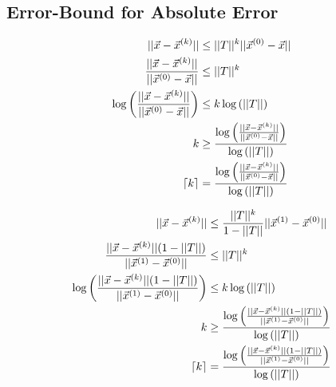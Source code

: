 	\subsection{Error-Bound for Absolute Error}
		\begin{align}
			||\vec{x}-\vec{x}^{(k)}|| &\leq ||T||^{k}||\vec{x}^{(0)}-\vec{x}||& \\
			\frac{||\vec{x}-\vec{x}^{(k)}||}{||\vec{x}^{(0)}-\vec{x}||} &\leq ||T||^{k}& \notag \\
			\log{\left(\frac{||\vec{x}-\vec{x}^{(k)}||}{||\vec{x}^{(0)}-\vec{x}||}\right)} &\leq k \log{(||T||)}& \notag \\
			k &\geq \frac{\log{\left(\frac{||\vec{x}-\vec{x}^{(k)}||}{||\vec{x}^{(0)}-\vec{x}||}\right)}}{\log{(||T||)}}& \notag \\
			\lceil k \rceil &= \frac{\log{\left(\frac{||\vec{x}-\vec{x}^{(k)}||}{||\vec{x}^{(0)}-\vec{x}||}\right)}}{\log{\left(||T||\right)}}&
		\end{align}

		\begin{align}
			||\vec{x}-\vec{x}^{(k)}|| &\leq \frac{||T||^{k}}{1-||T||}||\vec{x}^{(1)}-\vec{x}^{(0)}||& \\
			\frac{||\vec{x}-\vec{x}^{(k)}||(1-||T||)}{||\vec{x}^{(1)}-\vec{x}^{(0)}||} &\leq ||T||^{k}& \notag \\
			\log{\left(\frac{||\vec{x}-\vec{x}^{(k)}||(1-||T||)}{||\vec{x}^{(1)}-\vec{x}^{(0)}||}\right)} &\leq k \log{\left(||T||\right)}& \notag \\
			k &\geq \frac{\log{\left(\frac{||\vec{x}-\vec{x}^{(k)}||(1-||T||)}{||\vec{x}^{(1)}-\vec{x}^{(0)}||}\right)}}{\log{\left(||T||\right)}}& \notag \\
			\lceil k \rceil &= \frac{\log{\left(\frac{||\vec{x}-\vec{x}^{(k)}||(1-||T||)}{||\vec{x}^{(1)}-\vec{x}^{(0)}||}\right)}}{\log{\left(||T||\right)}}& \notag \\
		\end{align}
